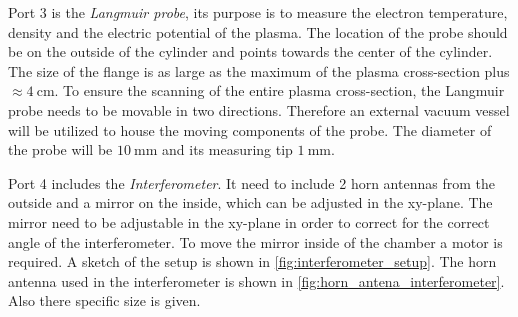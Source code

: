 Port 3 is the \emph{Langmuir probe}, its purpose is to measure the electron temperature, density and the electric potential of the plasma.
The location of the probe should be on the outside of the cylinder and points towards the center of the cylinder.
The size of the flange is as large as the maximum of the plasma cross-section plus $\approx 4~\si{\centi\meter}$.
To ensure the scanning of the entire plasma cross-section, the Langmuir probe needs to be movable in two directions.
Therefore an external vacuum vessel will be utilized to house the moving components of the probe.
The diameter of the probe will be $\SI{10}{\milli\meter}$ and its measuring tip $\SI{1}{\milli\meter}$.

Port 4 includes the \emph{Interferometer}.
It need to include 2 horn antennas from the outside and a mirror on the inside, which can be adjusted in the xy-plane.
The mirror need to be adjustable in the xy-plane in order to correct for the correct angle of the interferometer.
To move the mirror inside of the chamber a motor is required.
A sketch of the setup is shown in \autoref{fig:interferometer_setup}.
The horn antenna used in the interferometer is shown in \autoref{fig:horn_antena_interferometer}.
Also there specific size is given.

